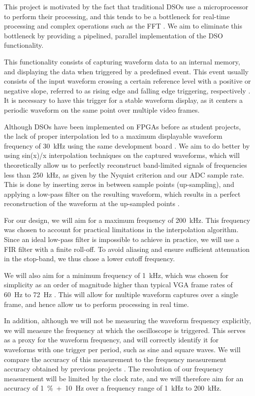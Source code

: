 \documentclass[journal,hidelinks]{IEEEtran}
\begin{document}
This project is motivated by the fact that traditional DSOs use a microprocessor to perform their processing, and this tends to be a bottleneck for real-time processing and complex operations such as the FFT \cite{tektronix_xyz_2016}. We aim to eliminate this bottleneck by providing a pipelined, parallel implementation of the DSO functionality.

This functionality consists of capturing waveform data to an internal memory, and displaying the data when triggered by a predefined event. This event usually consists of the input waveform crossing a certain reference level with a positive or negative slope, referred to as rising edge and falling edge triggering, respectively \cite{tektronix_xyz_2016}. It is necessary to have this trigger for a stable waveform display, as it centers a periodic waveform on the same point over multiple video frames.

Although DSOs have been implemented on FPGAs before as student projects, the lack of proper interpolation led to a maximum displayable waveform frequency of 30~kHz using the same development board \cite{jin_digital_2016}. We aim to do better by using sin(x)/x interpolation techniques on the captured waveforms, which will theoretically allow us to perfectly reconstruct band-limited signals of frequencies less than 250~kHz, as given by the Nyquist criterion and our ADC sample rate. This is done by inserting zeros in between sample points (up-sampling), and applying a low-pass filter on the resulting waveform, which results in a perfect reconstruction of the waveform at the up-sampled points \cite{rehorn_sin_2009}.

For our design, we will aim for a maximum frequency of 200~kHz. This frequency was chosen to account for practical limitations in the interpolation algorithm. Since an ideal low-pass filter is impossible to achieve in practice, we will use a FIR filter with a finite roll-off. To avoid aliasing and ensure sufficient attenuation in the stop-band, we thus chose a lower cutoff frequency.

We will also aim for a minimum frequency of 1~kHz, which was chosen for simplicity as an order of magnitude higher than typical VGA frame rates of 60~Hz to 72~Hz \cite{vga_timing}. This will allow for multiple waveform captures over a single frame, and hence allow us to perform processing in real time.

In addition, although we will not be measuring the waveform frequency explicitly, we will measure the frequency at which the oscilloscope is triggered. This serves as a proxy for the waveform frequency, and will correctly identify it for waveforms with one trigger per period, such as sine and square waves. We will compare the accuracy of this measurement to the frequency measurement accuracy obtained by previous projects \cite{jin_digital_2016}. The resolution of our frequency measurement will be limited by the clock rate, and we will therefore aim for an accuracy of 1~\%~+~10~Hz over a frequency range of 1~kHz to 200~kHz.
\end{document}
